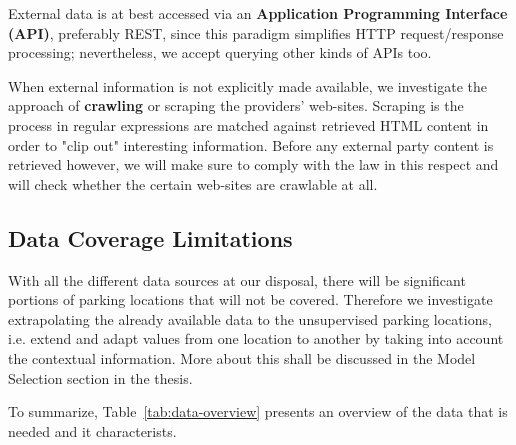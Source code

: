 \documentclass{article}
\begin{document}
External data is at best accessed via an \textbf{Application Programming Interface (API)}, preferably REST, since this paradigm simplifies HTTP request/response processing; nevertheless, we accept querying other kinds of APIs too.

When external information is not explicitly made available, we investigate the approach of \textbf{crawling} or scraping the providers' web-sites. Scraping is the process in regular expressions are matched against retrieved HTML content in order to "clip out" interesting information. Before any external party content is retrieved however, we will make sure to comply with the law in this respect and will check whether the certain web-sites are crawlable at all.

\subsection{Data Coverage Limitations}
With all the different data sources at our disposal, there will be significant portions of parking locations that will not be covered. Therefore we investigate extrapolating the already available data to the unsupervised parking locations, i.e. extend and adapt values from one location to another by taking into account the contextual information. More about this shall be discussed in the Model Selection section in the thesis.

To summarize, Table~\ref{tab:data-overview} presents an overview of the data that is needed and it characterists.

\begin{table}
	\caption{Data overview and its features}
    \label{tab:data-overview}
\end{table}
\end{document}
